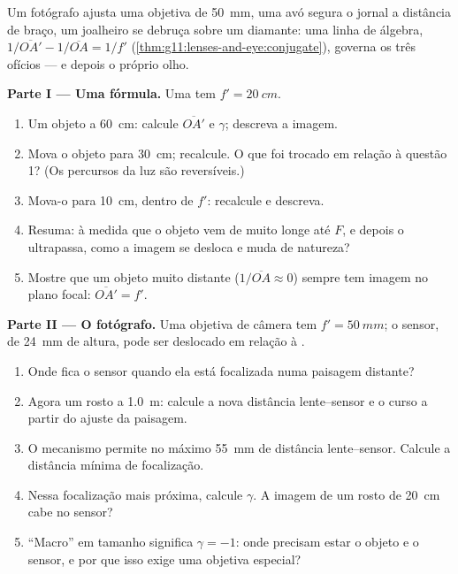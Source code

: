 \begin{problem}
\label{pb:g11:lenses-and-eye:1}
Um fotógrafo ajusta uma objetiva de \qty{50}{mm}, uma avó segura o jornal
a distância de braço, um joalheiro se debruça sobre um diamante: uma
linha de álgebra,
$1/\overline{OA'} - 1/\overline{OA} = 1/f'$
(\cref{thm:g11:lenses-and-eye:conjugate}), governa os três ofícios --- e
depois o próprio olho.

\medskip
\noindent\textbf{Parte I --- Uma fórmula.} Uma  tem
$f' = \qty{20}{cm}$.
\begin{enumerate}
  \item Um objeto a \qty{60}{cm}: calcule $\overline{OA'}$ e $\gamma$;
        descreva a imagem.
  \item Mova o objeto para \qty{30}{cm}; recalcule. O que foi trocado em
        relação à questão 1? (Os percursos da luz são reversíveis.)
  \item Mova-o para \qty{10}{cm}, dentro de $f'$: recalcule e descreva.
  \item Resuma: à medida que o objeto vem de muito longe até $F$, e
        depois o ultrapassa, como a imagem se desloca e muda de
        natureza?
  \item Mostre que um objeto muito distante ($1/\overline{OA} \approx 0$)
        sempre tem imagem no plano focal: $\overline{OA'} = f'$.
\end{enumerate}

\medskip
\noindent\textbf{Parte II --- O fotógrafo.}
Uma objetiva de câmera tem $f' = \qty{50}{mm}$; o sensor, de \qty{24}{mm}
de altura, pode ser deslocado em relação à .
\begin{enumerate}[resume]
  \item Onde fica o sensor quando ela está focalizada numa paisagem
        distante?
  \item Agora um rosto a \qty{1.0}{m}: calcule a nova distância
        lente--sensor e o curso a partir do ajuste da paisagem.
  \item O mecanismo permite no máximo \qty{55}{mm} de distância
        lente--sensor. Calcule a distância mínima de focalização.
  \item Nessa focalização mais próxima, calcule $\gamma$. A imagem de um
        rosto de \qty{20}{cm} cabe no sensor?
  \item ``Macro'' em tamanho  significa $\gamma = -1$: onde precisam
        estar o objeto e o sensor, e por que isso exige uma objetiva
        especial?
\end{enumerate}


\end{problem}
